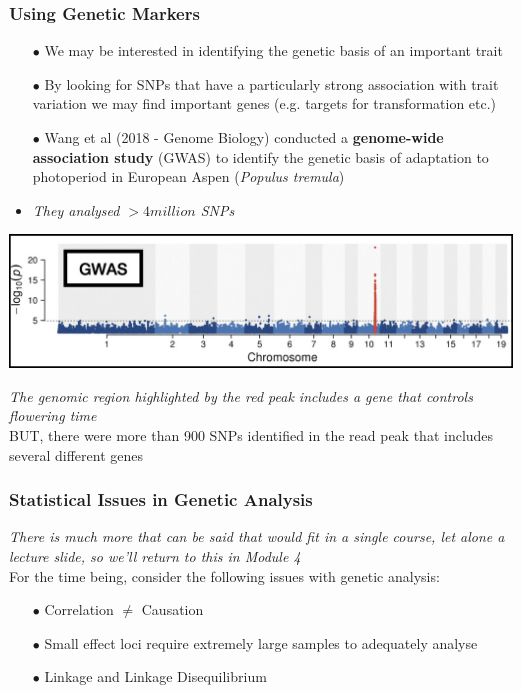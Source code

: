 \documentclass{beamer}
\begin{document}
\begin{frame}
	\frametitle{Using Genetic Markers}
\scriptsize 
\begin{itemize}	
	\item[$\bullet$] We may be interested in identifying the genetic basis of an important trait\\
	\item[$\bullet$]  By looking for SNPs that have a particularly strong association with trait variation we may find important genes (e.g. targets for transformation etc.)
	\vspace{15pt} \pause
	\item[$\bullet$] Wang et al (2018 - Genome Biology) conducted a \textbf{genome-wide association study} (GWAS) to identify the genetic basis of adaptation to photoperiod in European Aspen (\textit{Populus tremula}) 
	\item \textit{They analysed $>4 million$ SNPs } \pause
 	\end{itemize}
	
\includegraphics[keepaspectratio, width  = \textwidth]{img/gwas}

\textit{The genomic region highlighted by the red peak includes a gene that controls flowering time} \pause\\
BUT, there were more than 900 SNPs identified in the read peak that includes several different genes
\end{frame}



\begin{frame}
	\frametitle{Statistical Issues in Genetic Analysis}
	\textit{There is much more that can be said that would fit in a single course, let alone a lecture slide, so we'll return to this in Module 4}\\
	\vspace{30pt}
	For the time being, consider the following issues with genetic analysis:
\begin{itemize}
 \item[$\bullet$]		Correlation $\neq$ Causation
 \item[$\bullet$] 		Small effect loci require extremely large samples to adequately analyse
 \item[$\bullet$] 		Linkage and Linkage Disequilibrium
 \end{itemize}


 \end{frame}
\end{document}
